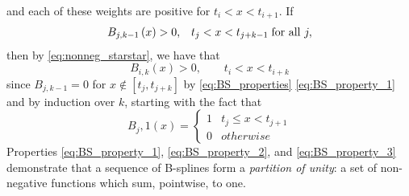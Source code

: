 \begin{enumerate}
\[\]
and each of these weights are positive for $t_i < x < t_{i+1}$. If
\[
\begin{array}{lr}
B_{j,k-1}\left(x\right) > 0, & t_j < x < t_{j+k-1} \; \textup{for all } j,
\end{array}
\]
then by \ref{eq:nonneg_starstar}, we have that 
\[
B_{i,k}\left(x\right) > 0,  \qquad t_i < x < t_{i+k}
\]
since $B_{j,k-1}= 0$ for $x \not \in \left[t_j,t_{j+k}\right]$ by \ref{eq:BS_properties} \ref{eq:BS_property_1} and by induction over $k$, starting with the fact that 
\[
B_j,1\left(x\right) = \left\{ \begin{array}{lr}
1 & t_j \le x < t_{j+1}\\
0 & otherwise
\end{array}\right.
\]
Properties \ref{eq:BS_property_1}, \ref{eq:BS_property_2}, and \ref{eq:BS_property_3} demonstrate that a sequence of B-splines form a \emph{partition of unity}: a set of non-negative functions which sum, pointwise, to one.
\end{enumerate}

